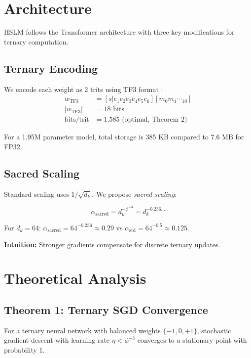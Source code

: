 \documentclass{article}
\newcommand{\ternaryset}{\{-1,0,+1\}}
\begin{document}
\section{Architecture}

HSLM follows the Transformer architecture \cite{vaswani2017attention} with three key modifications for ternary computation.

\subsection{Ternary Encoding}

We encode each weight as 2 trits using TF3 format \cite{vasilev2026gf16}:
\begin{align}
w_{\text{TF3}} &= [s|e_1e_2e_3e_4e_5e_6][m_0m_1\dotsm_{10}] \\
|w_{\text{TF3}}| &= 18 \text{ bits} \\
\text{bits/trit} &= 1.585 \text{ (optimal, Theorem 2)}
\end{align}

For a 1.95M parameter model, total storage is 385 KB compared to 7.6 MB for FP32.

\subsection{Sacred Scaling}

Standard scaling \cite{glorot2010understanding} uses $1/\sqrt{d_k}$. We propose \emph{sacred scaling}:

\begin{equation}
\alpha_{\text{sacred}} = d_k^{-\phi^{-3}} = d_k^{-0.236\dots}
\end{equation}

For $d_k = 64$: $\alpha_{\text{sacred}} = 64^{-0.236} \approx 0.29$ vs $\alpha_{\text{std}} = 64^{-0.5} \approx 0.125$.

\textbf{Intuition:} Stronger gradients compensate for discrete ternary updates.

\section{Theoretical Analysis}

\subsection{Theorem 1: Ternary SGD Convergence}

\begin{theorem}
For a ternary neural network with balanced weights $\ternaryset$, stochastic gradient descent with learning rate $\eta < \phi^{-3}$ converges to a stationary point with probability 1.
\end{theorem}
\end{document}
